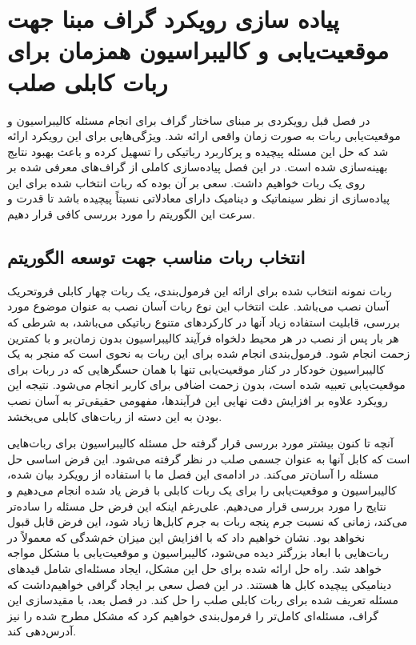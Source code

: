 \chapter{پیاده سازی رویکرد گراف مبنا جهت موقعیت‌یابی و کالیبراسیون همزمان برای ربات کابلی صلب}

در فصل قبل رویکردی بر مبنای ساختار گراف برای انجام مسئله کالیبراسیون و موقعیت‌یابی ربات به صورت زمان واقعی ارائه شد. ویژگی‌هایی برای این رویکرد ارائه شد که حل این مسئله پیچیده و پرکاربرد رباتیکی را تسهیل کرده و باعث بهبود نتایج بهینه‌سازی شده است. در این فصل پیاده‌سازی کاملی از گراف‌های معرفی شده بر روی یک ربات خواهیم داشت. سعی بر آن بوده که ربات انتخاب شده برای این پیاده‌سازی از نظر سینماتیک و دینامیک دارای معادلاتی نسبتاً پیچیده باشد تا قدرت و سرعت این الگوریتم را مورد بررسی کافی قرار دهیم.


\section{انتخاب ربات مناسب جهت توسعه الگوریتم}

ربات نمونه انتخاب شده برای ارائه این فرمول‌بندی، یک ربات چهار کابلی فروتحریک آسان نصب می‌باشد. علت انتخاب این نوع ربات آسان نصب به عنوان موضوع مورد بررسی، قابلیت استفاده زیاد آنها در کارکردهای متنوع رباتیکی می‌باشد، به شرطی که هر بار پس از نصب در هر محیط دلخواه فرآیند کالیبراسیون بدون زمان‌بر و با کمترین زحمت انجام شود. فرمول‌بندی انجام شده برای این ربات به نحوی است که منجر به یک کالیبراسیون خودکار در کنار موقعیت‌یابی تنها با همان حسگرهایی که در ربات برای موقعیت‌یابی تعبیه شده است، بدون زحمت اضافی برای کاربر انجام می‌شود. نتیجه این رویکرد علاوه بر افزایش دقت نهایی این فرآیندها، مفهومی حقیقی‌تر به آسان نصب بودن به این دسته از ربات‌های کابلی می‌بخشد.

آنچه تا کنون بیشتر مورد بررسی قرار گرفته حل مسئله کالیبراسیون برای ربات‌هایی است که کابل آنها به عنوان جسمی صلب در نظر گرفته می‌شود. این فرض اساسی حل مسئله را آسان‌تر می‌کند. در ادامه‌ی این فصل ما با استفاده از رویکرد بیان شده، کالیبراسیون و موقعیت‌یابی را برای یک ربات کابلی با فرض یاد شده انجام می‌دهیم و نتایج را مورد بررسی قرار می‌دهیم. علی‌رغم اینکه این فرض حل مسئله را ساده‌تر می‌کند، زمانی که نسبت جرم پنجه ربات به جرم کابل‌ها زیاد شود، این فرض قابل قبول نخواهد بود. نشان خواهیم داد که با افزایش این میزان خم‌شدگی که معمولاً در ربات‌هایی با ابعاد بزرگتر دیده می‌شود، کالیبراسیون و موقعیت‌یابی با مشکل مواجه خواهد شد. راه حل ارائه شده برای حل این مشکل، ایجاد مسئله‌ای شامل قیدهای دینامیکی پیچیده کابل ها هستند. در این فصل سعی بر ایجاد گرافی خواهیم‌داشت که مسئله تعریف شده برای ربات کابلی صلب را حل کند. در فصل بعد، با مقید‌سازی این گراف، مسئله‌ای کامل‌تر  را فرمول‌بندی خواهیم کرد که مشکل مطرح شده را نیز آدرس‌دهی کند.


